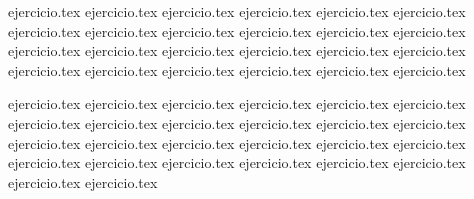 \begin{enumerate}
    \setcounter{enumi}{6}
    \begin{minipage}{0.45\textwidth}
    {ejercicio.tex}
    {ejercicio.tex}
    {ejercicio.tex}
    {ejercicio.tex}
    {ejercicio.tex}
    {ejercicio.tex}
    {ejercicio.tex}
    {ejercicio.tex}
    {ejercicio.tex}
    {ejercicio.tex}
    {ejercicio.tex}
    {ejercicio.tex}
    {ejercicio.tex}
    {ejercicio.tex}
    {ejercicio.tex}
    {ejercicio.tex}
    {ejercicio.tex}
    {ejercicio.tex}
    {ejercicio.tex}
    {ejercicio.tex}
    {ejercicio.tex}
    {ejercicio.tex}
    {ejercicio.tex}
    {ejercicio.tex}
    \end{minipage}%
    \begin{minipage}{0.45\textwidth}
    {ejercicio.tex}
    {ejercicio.tex}
    {ejercicio.tex}
    {ejercicio.tex}
    {ejercicio.tex}
    {ejercicio.tex}
    {ejercicio.tex}
    {ejercicio.tex}
    {ejercicio.tex}
    {ejercicio.tex}
    {ejercicio.tex}
    {ejercicio.tex}
    {ejercicio.tex}
    {ejercicio.tex}
    {ejercicio.tex}
    {ejercicio.tex}
    {ejercicio.tex}
    {ejercicio.tex}
    {ejercicio.tex}
    {ejercicio.tex}
    {ejercicio.tex}
    {ejercicio.tex}
    {ejercicio.tex}
    {ejercicio.tex}
    {ejercicio.tex}
    {ejercicio.tex}
    \end{minipage}
\end{enumerate}

